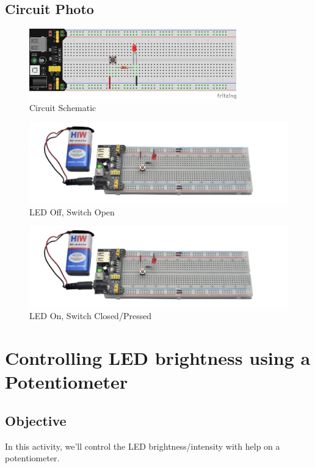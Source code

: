 \subsection{Circuit Photo}
\begin{figure}[htp]
    \centering
    \includegraphics[width=0.8\textwidth]{Pictures/lesson_circuits/LEDs/lesson_2.png}
    \caption{Circuit Schematic}
    \label{fig:pb_led_sch}
\end{figure}
\begin{figure}[htp]
    \centering
    \includegraphics[width=\textwidth]{Pictures/lesson_circuits/LEDs/LC_2.png}
    \caption{LED Off, Switch Open}
    \label{fig:pb_led_offl}
\end{figure}
\begin{figure}[htp]
    \centering
    \includegraphics[width=\textwidth]{Pictures/lesson_circuits/LEDs/LC_2.png}
    \caption{LED On, Switch Closed/Pressed}
    \label{fig:pb_led_onl}
\end{figure}



\section{Controlling LED brightness using a Potentiometer}
\subsection{Objective}
In this activity, we'll control the LED brightness/intensity with help on a potentiometer.
